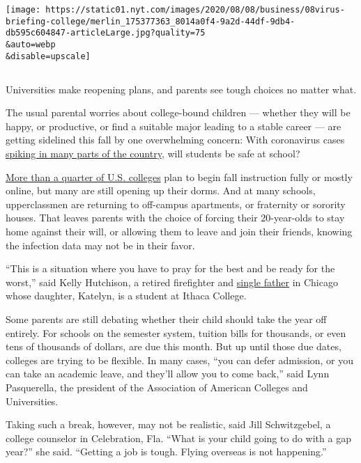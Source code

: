 \texttt{[image: https://static01.nyt.com/images/2020/08/08/business/08virus-briefing-college/merlin\_175377363\_8014a0f4-9a2d-44df-9db4-db595c604847-articleLarge.jpg?quality=75\\\&auto=webp\\\&disable=upscale]}

\hypertarget{section}{%
\subsection{}\label{section}}

Universities make reopening plans, and parents see tough choices no
matter what.

The usual parental worries about college-bound children --- whether they
will be happy, or productive, or find a suitable major leading to a
stable career --- are getting sidelined this fall by one overwhelming
concern: With coronavirus cases
\href{https://www.nytimes.com/interactive/2020/us/coronavirus-us-cases.html}{spiking
in many parts of the country}, will students be safe at school?

\href{https://collegecrisis.shinyapps.io/dashboard/}{More than a quarter
of U.S. colleges} plan to begin fall instruction fully or mostly online,
but many are still opening up their dorms. And at many schools,
upperclassmen are returning to off-campus apartments, or fraternity or
sorority houses. That leaves parents with the choice of forcing their
20-year-olds to stay home against their will, or allowing them to leave
and join their friends, knowing the infection data may not be in their
favor.

``This is a situation where you have to pray for the best and be ready
for the worst,'' said Kelly Hutchison, a retired firefighter and
\href{https://books.apple.com/us/book/book-title/id1291492202?ls=1}{single
father} in Chicago whose daughter, Katelyn, is a student at Ithaca
College.

Some parents are still debating whether their child should take the year
off entirely. For schools on the semester system, tuition bills for
thousands, or even tens of thousands of dollars, are due this month. But
up until those due dates, colleges are trying to be flexible. In many
cases, ``you can defer admission, or you can take an academic leave, and
they'll allow you to come back,'' said Lynn Pasquerella, the president
of the Association of American Colleges and Universities.

Taking such a break, however, may not be realistic, said Jill
Schwitzgebel, a college counselor in Celebration, Fla. ``What is your
child going to do with a gap year?'' she said. ``Getting a job is tough.
Flying overseas is not happening.''

